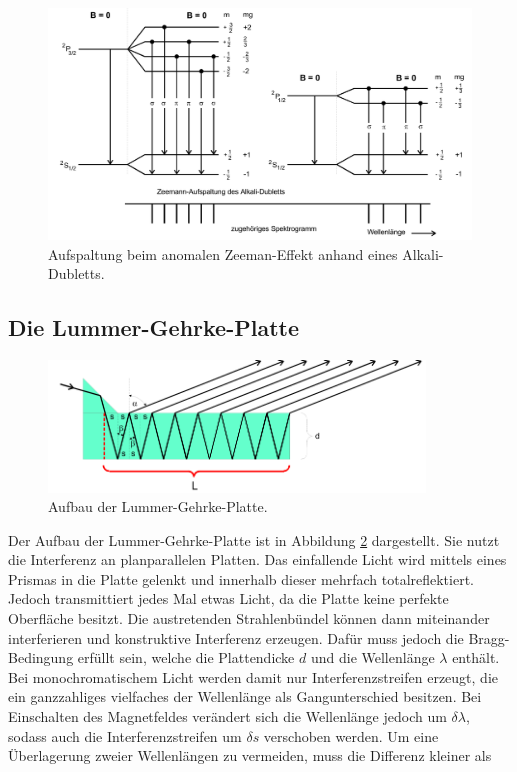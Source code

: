 \begin{figure}[h]
  \includegraphics[width=15cm]{Pics/Alkali.png}
  \caption{Aufspaltung beim anomalen Zeeman-Effekt anhand eines Alkali-Dubletts. \cite{anleitung01}}
  \label{fig:AlkaliBeispiel}
\end{figure}

\newpage

\subsection{Die Lummer-Gehrke-Platte}

\begin{figure}[h]
  \centering
  \includegraphics[width=10cm]{Pics/Lummer.png}
  \caption{Aufbau der Lummer-Gehrke-Platte. \cite{anleitung01}}
  \label{fig:LummerGehrke}
\end{figure}

Der Aufbau der Lummer-Gehrke-Platte ist in Abbildung \ref{fig:LummerGehrke} dargestellt.
Sie nutzt die Interferenz an planparallelen Platten. Das einfallende Licht wird
mittels eines Prismas in die Platte gelenkt und innerhalb dieser mehrfach
totalreflektiert. Jedoch transmittiert jedes Mal etwas Licht, da die Platte keine
perfekte Oberfläche besitzt. Die austretenden Strahlenbündel können dann miteinander
interferieren und konstruktive Interferenz erzeugen. Dafür muss jedoch die
Bragg-Bedingung erfüllt sein, welche die
Plattendicke $d$ und die Wellenlänge $\lambda$ enthält. Bei
monochromatischem Licht werden damit nur Interferenzstreifen erzeugt, die ein ganzzahliges
vielfaches der Wellenlänge
als Gangunterschied besitzen. Bei Einschalten des Magnetfeldes verändert sich die
Wellenlänge jedoch um $\delta\lambda$, sodass auch die Interferenzstreifen um
$\delta s$ verschoben werden. Um eine Überlagerung zweier Wellenlängen zu vermeiden,
muss die Differenz kleiner als

